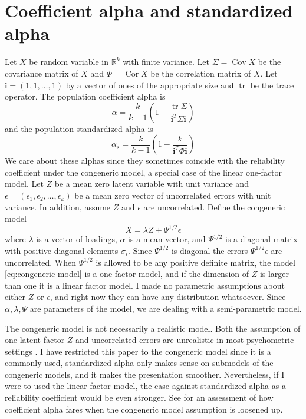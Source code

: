 \documentclass[twoside]{article}
\DeclareMathOperator{\tr}{tr}
\DeclareMathOperator{\Cor}{Cor}
\DeclareMathOperator{\Cov}{Cov}
\begin{document}
\section{Coefficient alpha and standardized alpha}
\label{sec:coefficienta alpha}

Let $X$ be random variable in $\mathbb{R}^{k}$ with finite variance.
Let $\Sigma=\Cov X$ be the covariance matrix of $X$ and $\Phi=\Cor X$
be the correlation matrix of $X$. Let $\mathbf{i}=\left(1,1,\ldots,1\right)$ by a vector of ones of the appropriate size and $\tr$ be the trace operator.
The population coefficient alpha \citep[][eq. 2]{cronbach1951coefficient} is
\begin{equation}
\alpha =  \frac{k}{k-1}\left(1-\frac{\tr\Sigma}{\mathbf{i}^{T}\Sigma\mathbf{i}}\right)\label{eq:Coefficient alpha}
\end{equation}
and the population standardized alpha \citep[][eq. 2]{Falk2011-ae} is
\begin{equation}
\alpha_s=\frac{k}{k-1}\left(1-\frac{k}{\mathbf{i}^{T}\Phi\mathbf{i}}\right)\label{eq:standardized alpha}
\end{equation}
We care about these alphas since they sometimes coincide with the reliability coefficient under the congeneric model, a special case of the linear one-factor model. Let $Z$ be a mean zero latent variable with unit variance and $\epsilon=\left(\epsilon_{1},\epsilon_{2},\ldots,\epsilon_{k}\right)$
be a mean zero vector of uncorrelated errors with unit variance. In addition, assume $Z$ and $\epsilon$ are uncorrelated. Define the congeneric model
\begin{equation}
X=\lambda Z+\Psi^{1/2}\epsilon\label{eq:congeneric model}
\end{equation}
where $\lambda$ is a vector of loadings, $\alpha$ is a mean vector, and $\Psi^{1/2}$ is a diagonal matrix with positive diagonal elements $\sigma_i$. Since $\Psi^{1/2}$ is diagonal the errors $\Psi^{1/2}\epsilon$ are uncorrelated. When $\Psi^{1/2}$ is allowed to be any positive definite matrix, the model \eqref{eq:congeneric model} is a one-factor model, and if the dimension of $Z$ is larger than one it is a linear factor model. I made no parametric assumptions about either $Z$ or $\epsilon$, and right now they can have any distribution whatsoever. Since $\alpha,\lambda,\Psi$ are parameters of the model, we are dealing with a semi-parametric model. 

The congeneric model is not necessarily a realistic model. Both the assumption of one latent factor $Z$ and uncorrelated errors are unrealistic in most psychometric settings \citep[][section 1.2 -- 1.3]{Green2009-le}. I have restricted this paper to the congeneric model since it is a commonly used, standardized alpha only makes sense on submodels of the congeneric models, and it makes the presentation smoother. Nevertheless, if I were to used the linear factor model, the case against standardized alpha as a reliability coefficient would be even stronger. See \citep[][section 2]{Green2009-le} for an assessment of how coefficient alpha fares when the congeneric model assumption is loosened up.
\end{document}

